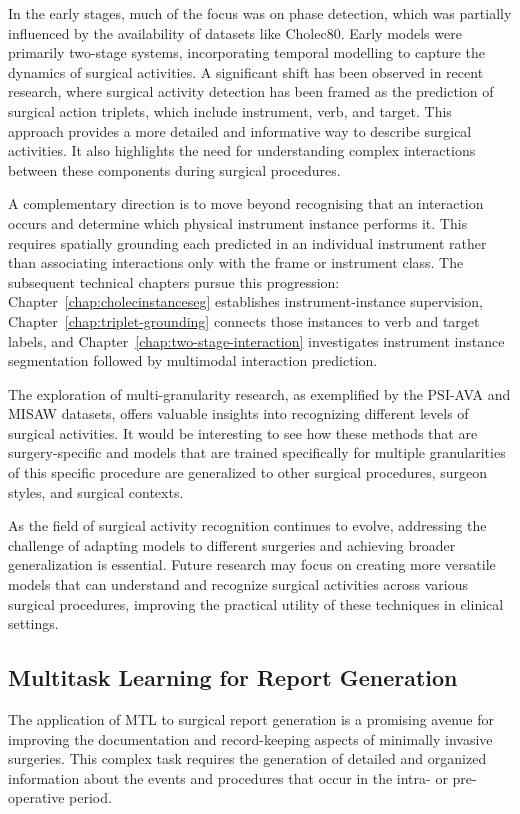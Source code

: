 In the early stages, much of the focus was on phase detection, which was partially influenced by the availability of datasets like Cholec80. Early models were primarily two-stage systems, incorporating temporal modelling to capture the dynamics of surgical activities. A significant shift has been observed in recent research, where surgical activity detection has been framed as the prediction of surgical action triplets, which include instrument, verb, and target. This approach provides a more detailed and informative way to describe surgical activities. It also highlights the need for understanding complex interactions between these components during surgical procedures.

A complementary direction is to move beyond recognising that an interaction occurs and determine which physical instrument instance performs it. This requires spatially grounding each predicted \ivttriplet in an individual instrument rather than associating interactions only with the frame or instrument class. The subsequent technical chapters pursue this progression: Chapter~\ref{chap:cholecinstanceseg} establishes instrument-instance supervision, Chapter~\ref{chap:triplet-grounding} connects those instances to verb and target labels, and Chapter~\ref{chap:two-stage-interaction} investigates instrument instance segmentation followed by multimodal interaction prediction.

The exploration of multi-granularity research, as exemplified by the PSI-AVA and MISAW datasets, offers valuable insights into recognizing different levels of surgical activities. It would be interesting to see how these methods that are surgery-specific and models that are trained specifically for multiple granularities of this specific procedure are generalized to other surgical procedures, surgeon styles, and surgical contexts.  

As the field of surgical activity recognition continues to evolve, addressing the challenge of adapting models to different surgeries and achieving broader generalization is essential. Future research may focus on creating more versatile models that can understand and recognize surgical activities across various surgical procedures, improving the practical utility of these techniques in clinical settings.

\subsection{Multitask Learning for Report Generation}
The application of MTL to surgical report generation is a promising avenue for improving the documentation and record-keeping aspects of minimally invasive surgeries. This complex task requires the generation of detailed and organized information about the events and procedures that occur in the intra- or pre-operative period.

